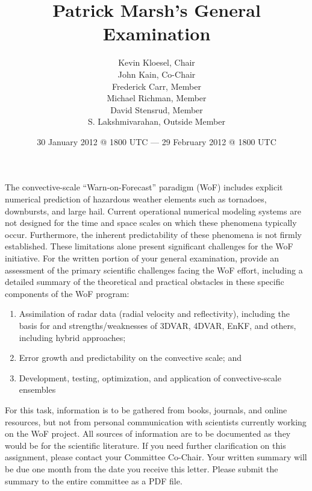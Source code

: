 \documentclass{article}
\begin{document}
\title{Patrick Marsh's General Examination}
\date{30 January 2012 @ 1800 UTC --- 29 February 2012 @ 1800 UTC}
\author{Kevin Kloesel, Chair\\
        John Kain, Co-Chair\\
        Frederick Carr, Member\\
        Michael Richman, Member\\
        David Stensrud, Member\\
        S. Lakshmivarahan, Outside Member\\}

\maketitle

\bigskip\bigskip

The convective-scale ``Warn-on-Forecast'' paradigm (WoF) includes explicit numerical prediction of hazardous weather elements such as tornadoes, downbursts, and large hail. Current operational numerical modeling systems are not designed for the time and space scales on which these phenomena typically occur. Furthermore, the inherent predictability of these phenomena is not firmly established. These limitations alone present significant challenges for the WoF initiative. For the written portion of your general examination, provide an assessment of the primary scientific challenges facing the WoF effort, including a detailed summary of the theoretical and practical obstacles in these specific components of the WoF program:


    \begin{enumerate}
        \setlength{\parskip}{.025in}
        \item Assimilation of radar data (radial velocity and reflectivity), including the basis for and strengths/weaknesses of 3DVAR, 4DVAR, EnKF, and others, including hybrid approaches;
        \item Error growth and predictability on the convective scale; and
        \item Development, testing, optimization, and application of convective-scale ensembles
    \end{enumerate}

For this task, information is to be gathered from books, journals, and online resources, but not from personal communication with scientists currently working on the WoF project. All sources of information are to be documented as they would be for the scientific literature. If you need further clarification on this assignment, please contact your Committee Co-Chair. Your written summary will be due one month from the date you receive this letter. Please submit the summary to the entire committee as a PDF file.
\end{document}
